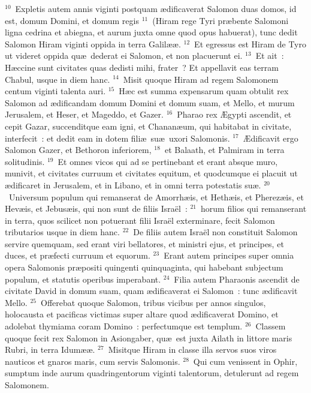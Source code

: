 ${}^{10}$~Expletis autem annis viginti postquam \ae dificaverat Salomon duas domos, id est, domum Domini, et domum regis
${}^{11}$~(Hiram rege Tyri pr\ae bente Salomoni ligna cedrina et abiegna, et aurum juxta omne quod opus habuerat), tunc dedit Salomon Hiram viginti oppida in terra Galil\ae \ae .
${}^{12}$~Et egressus est Hiram de Tyro ut videret oppida qu\ae\ dederat ei Salomon, et non placuerunt ei.
${}^{13}$~Et ait~: H\ae ccine sunt civitates quas dedisti mihi, frater~? Et appellavit eas terram Chabul, usque in diem hanc.
${}^{14}$~Misit quoque Hiram ad regem Salomonem centum viginti talenta auri.
${}^{15}$~H\ae c est summa expensarum quam obtulit rex Salomon ad \ae dificandam domum Domini et domum suam, et Mello, et murum Jerusalem, et Heser, et Mageddo, et Gazer.
${}^{16}$~Pharao rex \AE gypti ascendit, et cepit Gazar, succenditque eam igni, et Chanan\ae um, qui habitabat in civitate, interfecit~: et dedit eam in dotem fili\ae\ su\ae\ uxori Salomonis.
${}^{17}$~\AE dificavit ergo Salomon Gazer, et Bethoron inferiorem,
${}^{18}$~et Balaath, et Palmiram in terra solitudinis.
${}^{19}$~Et omnes vicos qui ad se pertinebant et erant absque muro, munivit, et civitates curruum et civitates equitum, et quodcumque ei placuit ut \ae dificaret in Jerusalem, et in Libano, et in omni terra potestatis su\ae .
${}^{20}$~Universum populum qui remanserat de Amorrh\ae is, et Heth\ae is, et Pherez\ae is, et Hev\ae is, et Jebus\ae is, qui non sunt de filiis Isra\"el~:
${}^{21}$~horum filios qui remanserant in terra, quos scilicet non potuerant filii Isra\"el exterminare, fecit Salomon tributarios usque in diem hanc.
${}^{22}$~De filiis autem Isra\"el non constituit Salomon servire quemquam, sed erant viri bellatores, et ministri ejus, et principes, et duces, et pr\ae fecti curruum et equorum.
${}^{23}$~Erant autem principes super omnia opera Salomonis pr\ae positi quingenti quinquaginta, qui habebant subjectum populum, et statutis operibus imperabant.
${}^{24}$~Filia autem Pharaonis ascendit de civitate David in domum suam, quam \ae dificaverat ei Salomon~: tunc \ae dificavit Mello.
${}^{25}$~Offerebat quoque Salomon, tribus vicibus per annos singulos, holocausta et pacificas victimas super altare quod \ae dificaverat Domino, et adolebat thymiama coram Domino~: perfectumque est templum.
${}^{26}$~Classem quoque fecit rex Salomon in Asiongaber, qu\ae\ est juxta Ailath in littore maris Rubri, in terra Idum\ae \ae .
${}^{27}$~Misitque Hiram in classe illa servos suos viros nauticos et gnaros maris, cum servis Salomonis.
${}^{28}$~Qui cum venissent in Ophir, sumptum inde aurum quadringentorum viginti talentorum, detulerunt ad regem Salomonem.

